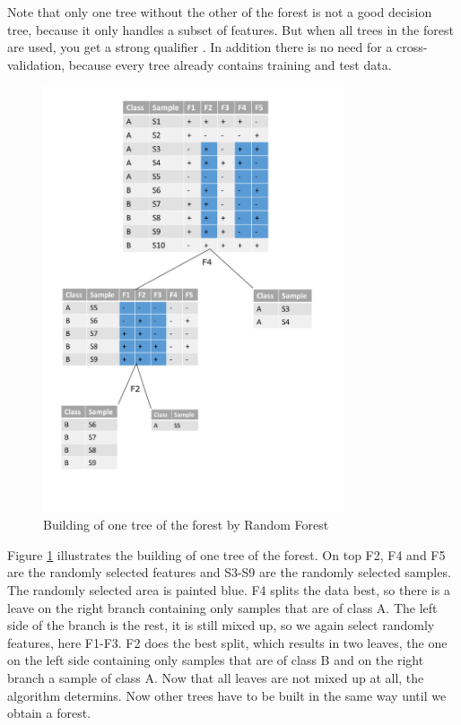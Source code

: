 \documentclass{sig-alternate-05-2015}
\begin{document}
Note that only one tree without the other of the forest is not a good decision tree, because it only handles a subset of features. But when all trees in the forest are used, you get a strong qualifier \cite{touw2012data}. In addition there is no need for a cross-validation, because every tree already contains training and test data.

\begin{figure}
\centering
\includegraphics[width=3.5in]{rf}
\caption{Building of one tree of the forest by Random Forest}
\label{fig:rf}
\end{figure}

Figure \ref{fig:rf} illustrates the building of one tree of the forest. On top F2, F4 and F5 are the randomly selected features and S3-S9 are the randomly selected samples. The randomly selected area is painted blue. F4 splits the data best, so there is a leave on the right branch containing only samples that are of class A. The left side of the branch is the rest, it is still mixed up, so we again select randomly features, here F1-F3. F2 does the best split, which results in two leaves, the one on the left side containing only samples that are of class B and on the right branch a sample of class A. Now that all leaves are not mixed up at all, the algorithm determins. Now other trees have to be built in the same way until we obtain a forest.
\end{document}
